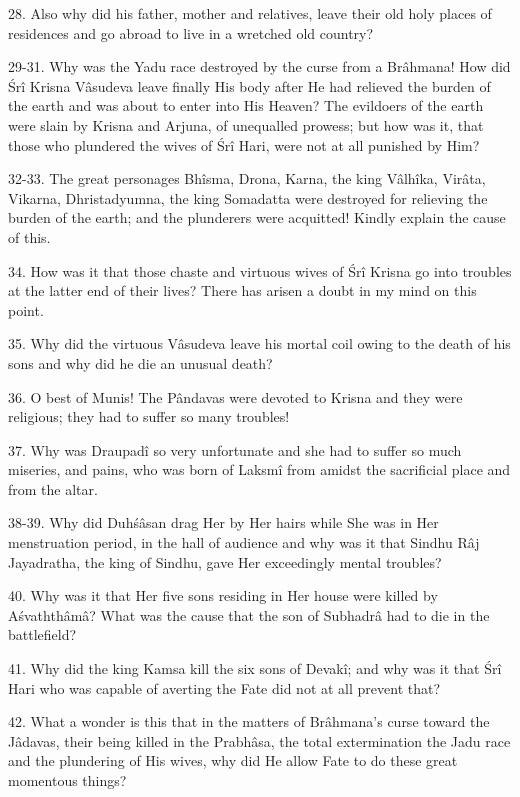 28. Also why did his father, mother and relatives, leave their old holy places of residences and go abroad to live in a wretched old country?

29-31. Why was the Yadu race destroyed by the curse from a Br\^ahmana! How did \'Sr\^i Krisna V\^asudeva leave finally His body after He had relieved the burden of the earth and was about to enter into His Heaven? The evildoers of the earth were slain by Krisna and Arjuna, of unequalled prowess;  but how was it, that those who plundered the wives of \'Sr\^i Hari, were not at all punished by Him?

32-33. The great personages Bh\^isma, Drona, Karna, the king V\^alh\^ika, Vir\^ata, Vikarna, Dhristadyumna, the king Somadatta were destroyed for relieving the burden of the earth; and the plunderers were acquitted! Kindly explain the cause of this.

34. How was it that those chaste and virtuous wives of \'Sr\^i Krisna go into troubles at the latter end of their lives? There has arisen a doubt in my mind on this point.

35. Why did the virtuous V\^asudeva leave his mortal coil owing to the death of his sons and why did he die an unusual death?

36. O best of Munis! The P\^andavas were devoted to Krisna and they were religious; they had to suffer so many troubles!

37. Why was Draupad\^i so very unfortunate and she had to suffer so much miseries, and pains, who was born of Laksm\^i from amidst the sacrificial place and from the altar.

38-39. Why did Duh\'s\^asan drag Her by Her hairs while She was in Her menstruation period, in the hall of audience and why was it that Sindhu R\^aj Jayadratha, the king of Sindhu, gave Her exceedingly mental troubles?

40. Why was it that Her five sons residing in Her house were killed by A\'svathth\^am\^a? What was the cause that the son of Subhadr\^a had to die in the battlefield?

41. Why did the king Kamsa kill the six sons of Devak\^i; and why was it that \'Sr\^i Hari who was capable of averting the Fate did not at all prevent that?

42. What a wonder is this that in the matters of Br\^ahmana's curse toward the J\^adavas, their being killed in the Prabh\^asa, the total extermination the Jadu race and the plundering of His wives, why did He allow Fate to do these great momentous things?

